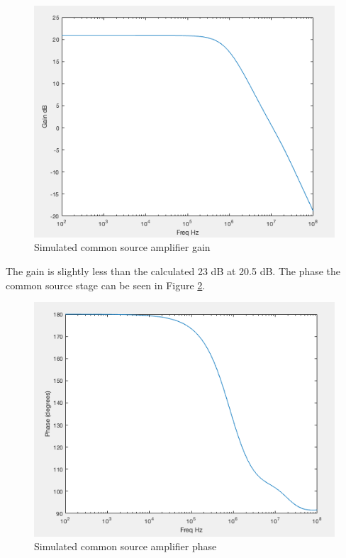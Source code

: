 \begin{figure}[H]
	\begin{center}
		\includegraphics[scale=.30]{Simulations/gaincommonsource.png}
		\caption{Simulated common source amplifier gain}
		\label{fig:gaincs}
	\end{center}
\end{figure} 

The gain is slightly less than the calculated 23 dB at 20.5 dB. The phase the common source stage can be seen in Figure \ref{fig:csphase}.

\begin{figure}[H]
	\begin{center}
		\includegraphics[scale=.30]{Simulations/phasecommonsource.png}
		\caption{Simulated common source amplifier phase}
		\label{fig:csphase}
	\end{center}
\end{figure} 

